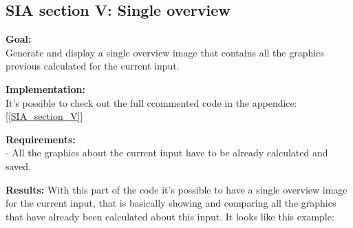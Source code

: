 \newpage
\subsection{SIA section V: Single overview}

\textbf{Goal:}\\
Generate and display a single overview image that contains all the graphics previous calculated for the current input.

\textbf{Implementation:}\\
It's possible to check out the full ccommented code in the appendice: [\ref{SIA_section_V}]

\textbf{Requirements:}\\
- All the graphics about the current input have to be already calculated and saved.

\textbf{Results:}
With this part of the code it's possible to have a single overview image for the current input, that is basically showing and comparing all the graphics that have already been calculated about this input. It looks like this example:



